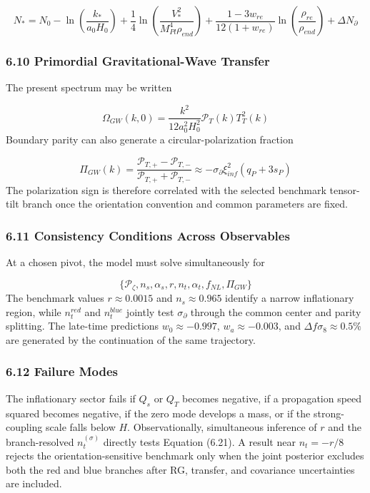 \documentclass[aps,prd,onecolumn,superscriptaddress,nofootinbib,longbibliography,10pt]{revtex4-2}
\begin{document}
  \[ N_* = N_0 - \ln\left(\frac{k_*}{a_0 H_0}\right) + \frac{1}{4}\ln\left(\frac{V_*^2}{M_{Pl}^4 \rho_{end}}\right) + \frac{1 - 3w_{re}}{12(1 + w_{re})}\ln\left(\frac{\rho_{re}}{\rho_{end}}\right) + \Delta N_\partial \]

  
\subsubsection*{6.10 Primordial Gravitational-Wave Transfer}

  The present spectrum may be written


  \[ \Omega_{GW}(k, 0) = \frac{k^2}{12 a_0^2 H_0^2} \mathcal{P}_T(k) T_T^2(k) \]
  Boundary parity can also generate a circular-polarization fraction


  \[ \Pi_{GW}(k) = \frac{\mathcal{P}_{T,+} - \mathcal{P}_{T,-}}{\mathcal{P}_{T,+} + \mathcal{P}_{T,-}} \approx -\sigma_\partial \xi_{inf}^2 (q_P + 3s_P) \]
  The polarization sign is therefore correlated with the selected benchmark tensor-tilt branch once the orientation convention and common parameters are fixed.



  
\subsubsection*{6.11 Consistency Conditions Across Observables}

  At a chosen pivot, the model must solve simultaneously for


  \[ \{\mathcal{P}_\zeta, n_s, \alpha_s, r, n_t, \alpha_t, f_{NL}, \Pi_{GW}\} \]
  The benchmark values \(r \approx 0.0015\) and \(n_s \approx 0.965\) identify a narrow inflationary region, while \(n_t^{red}\) and \(n_t^{blue}\) jointly test \(\sigma_\partial\) through the common center and parity splitting. The late-time predictions \(w_0 \approx -0.997\), \(w_a \approx -0.003\), and \(\Delta f\sigma_8 \approx 0.5\%\) are generated by the continuation of the same trajectory.



  
\subsubsection*{6.12 Failure Modes}

  The inflationary sector fails if \(Q_s\) or \(Q_T\) becomes negative, if a propagation speed squared becomes negative, if the zero mode develops a mass, or if the strong-coupling scale falls below \(H\). Observationally, simultaneous inference of \(r\) and the branch-resolved \(n_t^{(\sigma)}\) directly tests Equation (6.21). A result near \(n_t = -r/8\) rejects the orientation-sensitive benchmark only when the joint posterior excludes both the red and blue branches after RG, transfer, and covariance uncertainties are included.
\end{document}
